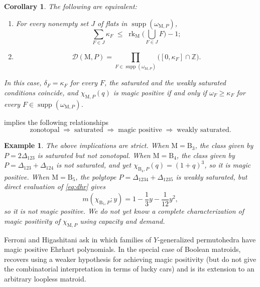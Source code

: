 \documentclass[11pt,a4paper,reqno]{amsart}
\theoremstyle{results}
\newtheorem{corollary}[thm]{Corollary}
\theoremstyle{definitions}
\newtheorem{example}[thm]{Example}
\def\Z{\mathbb{Z}}
\def\Z{\mathbb{Z}}
\newcommand{\B}{\textrm{B}}
\newcommand{\rk}{\operatorname{rk}}
\newcommand{\M}{\mathrm{M}}
\DeclareMathOperator{\supp}{supp}
\newcommand{\capa}{\kappa}   %
\newcommand{\dem}{\delta}    %
\newcommand{\DHR}{\mathcal{D}}
\begin{document}
\begin{corollary}\label{cor:box}
  The following are equivalent:
  \begin{enumerate}[leftmargin=20pt]
    \item For every nonempty set $J$ of flats in $\supp(\omega_{\M,P})$,
      \[
        \sum_{F \in J} \capa_F \;\leqslant\; \rk_\M\Big(\bigcup_{F \in J} F\Big) - 1 ;
      \]
    \item 
    \[
    \DHR(\M,P) = \prod_{F \in \supp(\omega_{\M,P})} \big([0, \capa_F] \cap \Z\big).
    \]
  \end{enumerate}
  In this case, $\dem_F = \capa_F$ for every $F$, the saturated and the weakly
  saturated conditions coincide, and $\chi_{\M,P}(q)$ is magic positive if and only
  if $\omega_F \geqslant \capa_F$ for every $F \in \supp(\omega_{\M,P})$.
\end{corollary}

 implies the following relationships 
\begin{equation}\label{eq:sandwich}
  \text{zonotopal} \;\Longrightarrow\; \text{saturated} \;\Longrightarrow\;
  \text{magic positive} \;\Longrightarrow\; \text{weakly saturated}.
\end{equation}

\begin{example}
\label{ex:strict-implications}
The above implications are strict. When $\M = \B_3$, the class given by 
$P= 2\Delta_{123}$ is saturated but not zonotopal. When $\M = \B_4$, the class given by
$P=\Delta_{123}+\Delta_{124}$ is not saturated, and yet
$\chi_{\B_4,P}(q)=(1+q)^3$, so it is magic positive. 
When $\M = \B_5$, the polytope
$P=\Delta_{1234}+\Delta_{1235}$ is weakly saturated, but direct evaluation of \eqref{eq:dhr} gives
\[
  m(\chi_{\B_5,P};y)=1-\frac13y-\frac1{12}y^2,
\]
so it is not magic positive.
We do not yet know a complete characterization of magic positivity of $\chi_{\M, P}$ using capacity and demand. 
\end{example}

Ferroni and Higashitani ask in \cite[Problem 4.23]{ferroni2024examples} which
families of $Y$-generalized permutohedra have magic positive Ehrhart polynomials. 
In the special case of Boolean matroids,  recovers \cite[Theorem 3.19]{avila2026luck} using a weaker hypothesis for achieving magic positivity (but do not give the combinatorial interpretation in terms of lucky cars) and
 is its extension to an arbitrary loopless matroid. 
\end{document}
